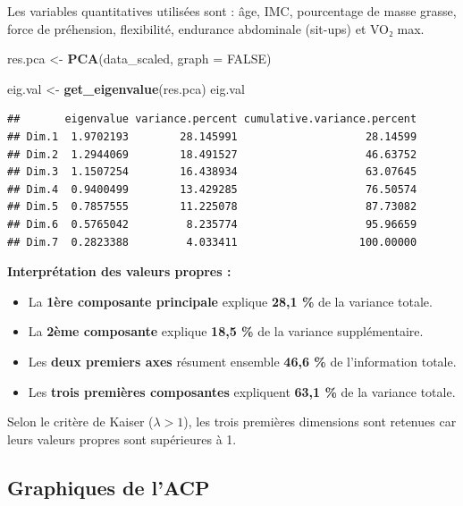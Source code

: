 \documentclass[
]{article}
\newenvironment{Shaded}{\begin{snugshade}}{\end{snugshade}}
\newcommand{\AttributeTok}[1]{\textcolor[rgb]{0.13,0.29,0.53}{#1}}
\newcommand{\ConstantTok}[1]{\textcolor[rgb]{0.56,0.35,0.01}{#1}}
\newcommand{\FunctionTok}[1]{\textcolor[rgb]{0.13,0.29,0.53}{\textbf{#1}}}
\newcommand{\NormalTok}[1]{#1}
\newcommand{\OtherTok}[1]{\textcolor[rgb]{0.56,0.35,0.01}{#1}}
\providecommand{\tightlist}{%
  \setlength{\itemsep}{0pt}\setlength{\parskip}{0pt}}
\begin{document}
Les variables quantitatives utilisées sont : âge, IMC, pourcentage de
masse grasse, force de préhension, flexibilité, endurance abdominale
(sit-ups) et VO₂ max.

\begin{Shaded}
\begin{Highlighting}[]
\NormalTok{res.pca }\OtherTok{\textless{}{-}} \FunctionTok{PCA}\NormalTok{(data\_scaled, }\AttributeTok{graph =} \ConstantTok{FALSE}\NormalTok{)}

\NormalTok{eig.val }\OtherTok{\textless{}{-}} \FunctionTok{get\_eigenvalue}\NormalTok{(res.pca)}
\NormalTok{eig.val}
\end{Highlighting}
\end{Shaded}

\begin{verbatim}
##       eigenvalue variance.percent cumulative.variance.percent
## Dim.1  1.9702193        28.145991                    28.14599
## Dim.2  1.2944069        18.491527                    46.63752
## Dim.3  1.1507254        16.438934                    63.07645
## Dim.4  0.9400499        13.429285                    76.50574
## Dim.5  0.7857555        11.225078                    87.73082
## Dim.6  0.5765042         8.235774                    95.96659
## Dim.7  0.2823388         4.033411                   100.00000
\end{verbatim}

\textbf{Interprétation des valeurs propres :}

\begin{itemize}
\tightlist
\item
  La \textbf{1ère composante principale} explique \textbf{28,1 \%} de la
  variance totale.
\item
  La \textbf{2ème composante} explique \textbf{18,5 \%} de la variance
  supplémentaire.
\item
  Les \textbf{deux premiers axes} résument ensemble \textbf{46,6 \%} de
  l'information totale.
\item
  Les \textbf{trois premières composantes} expliquent \textbf{63,1 \%}
  de la variance totale.
\end{itemize}

Selon le critère de Kaiser (\(\lambda > 1\)), les trois premières
dimensions sont retenues car leurs valeurs propres sont supérieures à 1.

\subsection{Graphiques de l'ACP}\label{graphiques-de-lacp}
\end{document}
